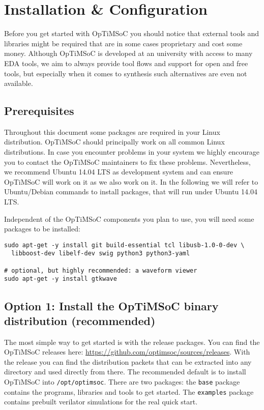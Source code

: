 \chapter{Installation \& Configuration}
\label{chap:installation}

Before you get started with OpTiMSoC you should notice that external
tools and libraries might be required that are in some cases
proprietary and cost some money. Although OpTiMSoC is developed at an
university with access to many EDA tools, we aim to always provide
tool flows and support for open and free tools, but especially when it
comes to synthesis such alternatives are even not available.

\section{Prerequisites}

Throughout this document some packages are required in your Linux
distribution. OpTiMSoC should principally work on all common Linux
distributions. In case you encounter problems in your system we highly
encourage you to contact the OpTiMSoC maintainers to fix these
problems. Nevertheless, we recommend Ubuntu 14.04 LTS as development
system and can ensure OpTiMSoC will work on it as we also work on
it. In the following we will refer to Ubuntu/Debian commands to
install packages, that will run under Ubuntu 14.04 LTS.

Independent of the OpTiMSoC components you plan to use, you will need some
packages to be installed:

\begin{lstlisting}
sudo apt-get -y install git build-essential tcl libusb-1.0-0-dev \
  libboost-dev libelf-dev swig python3 python3-yaml

# optional, but highly recommended: a waveform viewer
sudo apt-get -y install gtkwave
\end{lstlisting}

\section{Option 1: Install the OpTiMSoC binary distribution (recommended)}

The most simple way to get started is with the release packages. You
can find the OpTiMSoC releases here:
\url{https://github.com/optimsoc/sources/releases}. With the release
you can find the distribution packets that can be extracted into any
directory and used directly from there. The recommended default is to
install OpTiMSoC into \verb|/opt/optimsoc|. There are two packages:
the \verb|base| package contains the programs, libraries and tools
to get started. The \verb|examples| package contains prebuilt verilator
simulations for the real quick start.

